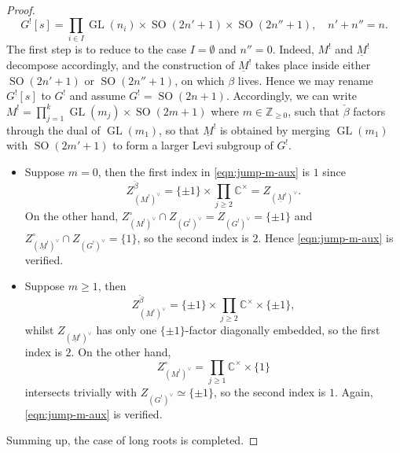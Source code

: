 \documentclass[11pt, a3paper, openany]{article}
\newcommand{\Z}{\ensuremath{\mathbb{Z}}}
\newcommand{\CC}{\ensuremath{\mathbb{C}}}
\newcommand{\GL}{\operatorname{GL}}
\newcommand{\SO}{\operatorname{SO}}
\theoremstyle{remark}
\theoremstyle{remark}
\theoremstyle{remark}
\newenvironment{Proof of claim}
  {\begin{proof}[\normalfont \textbf{Proof of claim}]}
  {\end{proof}}
\begin{document}
\begin{proof}
	\[ G^![s] = \prod_{i \in I} \GL(n_i) \times \SO(2n'+1) \times \SO(2n''+1), \quad n' + n'' = n. \]
	The first step is to reduce to the case $I = \emptyset$ and $n'' = 0$. Indeed, $M^!$ and $\underline{M}^!$ decompose accordingly, and the construction of $\underline{M}^!$ takes place inside either $\SO(2n'+1)$ or $\SO(2n''+1)$, on which $\beta$ lives. Hence we may rename $G^![s]$ to $G^!$ and assume $G^! = \SO(2n+1)$.
	Accordingly, we can write $M^! = \prod_{j=1}^k \GL(m_j) \times \SO(2m+1)$ where $m \in \Z_{\geq 0}$, such that $\check{\beta}$ factors through the dual of $\GL(m_1)$, so that $\underline{M}^!$ is obtained by merging $\GL(m_1)$ with $\SO(2m'+1)$ to form a larger Levi subgroup of $G^!$.
	\begin{itemize}
		\item Suppose $m=0$, then the first index in \eqref{eqn:jump-m-aux} is $1$ since
		\[ Z_{(M^!)^\vee}^{\check{\beta}} = \{\pm 1\} \times \prod_{j \geq 2} \CC^\times = Z_{(\underline{M}^!)^\vee}. \]
		On the other hand, $Z_{(M^!)^\vee}^\circ \cap Z_{(G^!)^\vee} = Z_{(G^!)^\vee} = \{\pm 1\}$ and $Z_{(\underline{M}^!)^\vee}^\circ \cap Z_{(G^!)^\vee} = \{1\}$, so the second index is $2$. Hence \eqref{eqn:jump-m-aux} is verified.
		\item Suppose $m \geq 1$, then
		\[ Z_{(M^!)^\vee}^{\check{\beta}} = \{\pm 1\} \times \prod_{j \geq 2} \CC^\times \times \{\pm 1\} ,\]
		whilst $Z_{(\underline{M}^!)^\vee}$ has only one $\{\pm 1\}$-factor diagonally embedded, so the first index is $2$. On the other hand,
		\[ Z_{(M^!)^\vee}^\circ = \prod_{j \geq 1} \CC^\times \times \{1\} \]
		intersects trivially with $Z_{(G^!)^\vee} \simeq \{\pm 1\}$, so the second index is $1$. Again, \eqref{eqn:jump-m-aux} is verified.
	\end{itemize}
	Summing up, the case of long roots is completed.
\end{proof}
\end{document}
